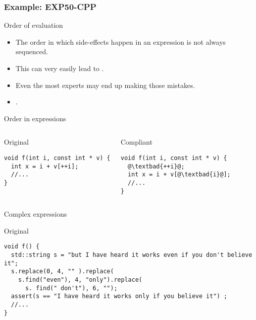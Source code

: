 \subsubsection{Example: EXP50-CPP}

\begin{frame}{Order of evaluation}
\begin{itemize}
  \item The order in which side-effects happen in an expression is not
        always sequenced.

  \vfill
  \item This can very easily lead to .

  \vfill
  \item Even the most experts may end up making those mistakes.

  \vfill
  \item {}.
\end{itemize}
\end{frame}

\begin{frame}[t,fragile]{Order in expressions}
\begin{columns}

\begin{block}{Original}
\begin{lstlisting}
void f(int i, const int * v) {
  int x = i + v[++i];
  //...
}
\end{lstlisting}
\end{block}

\pause
{}
\begin{block}{Compliant}
\begin{lstlisting}[escapechar=@]
void f(int i, const int * v) {
  @\textbad{++i}@;
  int x = i + v[@\textbad{i}@];
  //...
}
\end{lstlisting}
\end{block}

\end{columns}
\end{frame}

\begin{frame}[t,fragile]{Complex expressions}
\begin{block}{Original}
\begin{lstlisting}
void f() {
  std::string s = "but I have heard it works even if you don't believe it";
  s.replace(0, 4, "" ).replace(
    s.find("even"), 4, "only").replace(
      s. find(" don't"), 6, "");
  assert(s == "I have heard it works only if you believe it") ;
  //...
}
\end{lstlisting}
\end{block}
\end{frame}


